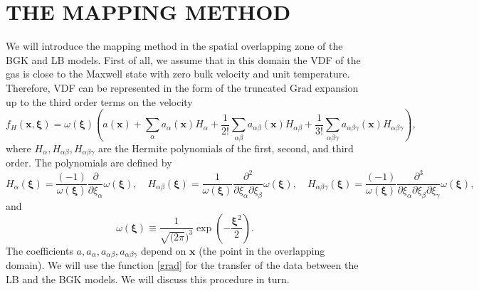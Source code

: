 \documentclass{aip-cp}
\newcommand{\bxi}{\boldsymbol{\xi}}
\newcommand{\bx}{\boldsymbol{x}}
\begin{document}


\section{THE MAPPING METHOD}\label{sec:mapping}

We will introduce the mapping method in the spatial overlapping zone of the BGK and LB models.
First of all, we assume that in this domain the VDF of the gas is close to the Maxwell state with zero bulk velocity and unit temperature.
Therefore, VDF can be represented in the form of the truncated Grad expansion up to the third order terms on the velocity
\begin{equation}\label{grad}
    f_H(\bx,\bxi) = \omega(\bxi)\left(a(\bx) +\sum_{\alpha}a_{\alpha}(\bx)H_{\alpha}+\frac{1}{2!}\sum_{\alpha\beta}a_{\alpha \beta}(\bx)H_{\alpha\beta}+\frac{1}{3!}\sum_{\alpha\beta \gamma}a_{\alpha\beta\gamma}(\bx)H_{\alpha\beta\gamma}\right),
\end{equation}
where $H_{\alpha}, H_{\alpha\beta}, H_{\alpha\beta\gamma}$ are the Hermite polynomials of the first, second, and third order. The polynomials are defined by
$$
H_\alpha(\bxi)=\frac{(-1)}{\omega(\bxi)}\frac{\partial}{\partial \xi_\alpha}\omega(\bxi),  \quad H_{\alpha\beta}(\bxi)=\frac{1}{\omega(\bxi)}\frac{\partial^2}{\partial \xi_\alpha\partial \xi_\beta}\omega(\bxi),
\quad H_{\alpha\beta \gamma}(\bxi)=\frac{(-1)}{\omega(\bxi)}\frac{\partial^3}{\partial \xi_\alpha\partial \xi_\beta \partial \xi_\gamma}\omega(\bxi),
$$
and
$$
 \omega(\bxi)\equiv \frac{1}{\sqrt{(2\pi})^3}\exp\left(-\frac{\bxi^2}{2}\right).
$$
 The coefficients $a, a_{\alpha},a_{\alpha\beta}, a_{\alpha\beta \gamma}$ depend on $\bx$ (the point in the overlapping domain).
 We will use the function \eqref{grad} for the transfer of the data between the LB and the BGK models. We will discuss this procedure in turn.
\end{document}
